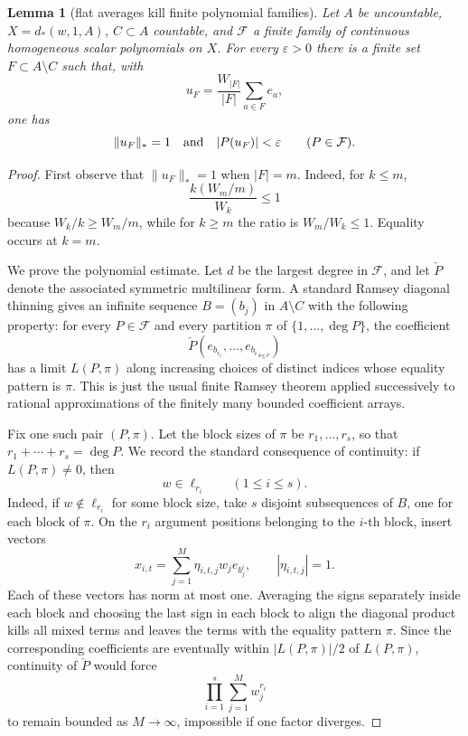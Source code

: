\documentclass[11pt]{article}
\newtheorem{lemma}{Lemma}
\newcommand{\eps}{\varepsilon}
\begin{document}
\begin{lemma}[flat averages kill finite polynomial families]\label{lem:flat}
Let \(A\) be uncountable, \(X=d_*(w,1,A)\), \(C\subset A\) countable, and
\(\mathcal F\) a finite family of continuous homogeneous scalar polynomials
on \(X\).  For every \(\eps>0\) there is a finite set
\(F\subset A\setminus C\) such that, with
\[
  u_F=\frac{W_{|F|}}{|F|}\sum_{a\in F}e_a,
\]
one has
\[
  \|u_F\|_*=1
  \quad\hbox{and}\quad
  |P(u_F)|<\eps \qquad(P\in\mathcal F).
\]
\end{lemma}

\begin{proof}
First observe that \(\|u_F\|_*=1\) when \(|F|=m\).  Indeed, for
\(k\le m\),
\[
  \frac{k(W_m/m)}{W_k}\le1
\]
because \(W_k/k\ge W_m/m\), while for \(k\ge m\) the ratio is
\(W_m/W_k\le1\).  Equality occurs at \(k=m\).

We prove the polynomial estimate.  Let \(d\) be the largest degree in
\(\mathcal F\), and let \(\check P\) denote the associated symmetric
multilinear form.  A standard Ramsey diagonal thinning gives an infinite
sequence \(B=(b_j)\) in \(A\setminus C\) with the following property: for
every \(P\in\mathcal F\) and every partition \(\pi\) of
\(\{1,\ldots,\deg P\}\), the coefficient
\[
  \check P(e_{b_{i_1}},\ldots,e_{b_{i_{\deg P}}})
\]
has a limit \(L(P,\pi)\) along increasing choices of distinct indices whose
equality pattern is \(\pi\).  This is just the usual finite Ramsey theorem
applied successively to rational approximations of the finitely many bounded
coefficient arrays.

Fix one such pair \((P,\pi)\).  Let the block sizes of \(\pi\) be
\(r_1,\ldots,r_s\), so that \(r_1+\cdots+r_s=\deg P\).  We record the
standard consequence of continuity: if \(L(P,\pi)\ne0\), then
\[
  w\in\ell_{r_i}\qquad(1\le i\le s).
\]
Indeed, if \(w\notin\ell_{r_i}\) for some block size, take \(s\) disjoint
subsequences of \(B\), one for each block of \(\pi\).  On the \(r_i\) argument
positions belonging to the \(i\)-th block, insert vectors
\[
  x_{i,t}=\sum_{j=1}^M \eta_{i,t,j} w_j e_{b^i_j},
  \qquad |\eta_{i,t,j}|=1 .
\]
Each of these vectors has norm at most one.  Averaging the signs separately
inside each block and choosing the last sign in each block to align the
diagonal product kills all mixed terms and leaves the terms with the equality
pattern \(\pi\).  Since the corresponding coefficients are eventually within
\(|L(P,\pi)|/2\) of \(L(P,\pi)\), continuity of \(\check P\) would force
\[
  \prod_{i=1}^s\sum_{j=1}^M w_j^{r_i}
\]
to remain bounded as \(M\to\infty\), impossible if one factor diverges.


\end{proof}
\end{document}
